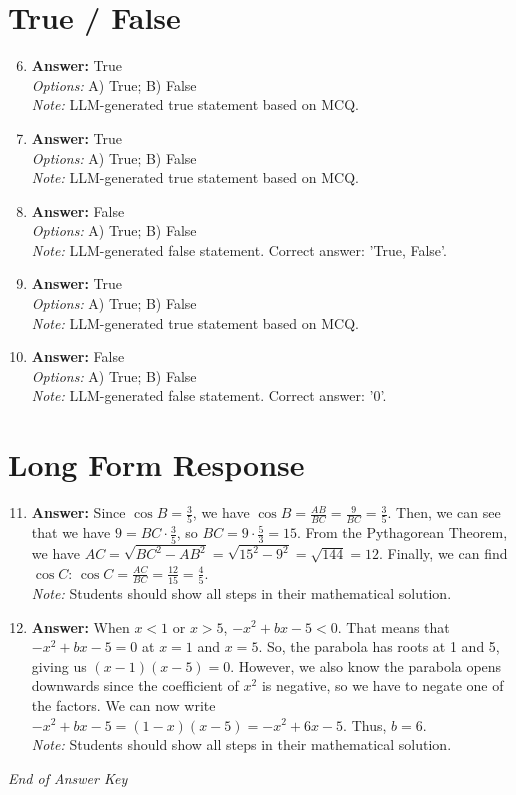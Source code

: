 \documentclass[12pt]{article}
\begin{document}
\section*{True / False}
\begin{enumerate}[label=\arabic*.]
\setcounter{enumi}{5}
\item \textbf{Answer:} True
\\ \textit{Options:} A) True; B) False
\\ \textit{Note:} LLM-generated true statement based on MCQ.
\item \textbf{Answer:} True
\\ \textit{Options:} A) True; B) False
\\ \textit{Note:} LLM-generated true statement based on MCQ.
\item \textbf{Answer:} False
\\ \textit{Options:} A) True; B) False
\\ \textit{Note:} LLM-generated false statement. Correct answer: 'True, False'.
\item \textbf{Answer:} True
\\ \textit{Options:} A) True; B) False
\\ \textit{Note:} LLM-generated true statement based on MCQ.
\item \textbf{Answer:} False
\\ \textit{Options:} A) True; B) False
\\ \textit{Note:} LLM-generated false statement. Correct answer: '0'.
\end{enumerate}

\section*{Long Form Response}
\begin{enumerate}[label=\arabic*.]
\setcounter{enumi}{10}
\item \textbf{Answer:} Since $\cos{B}=\frac{3}{5}$, we have $\cos{B}=\frac{AB}{BC}=\frac{9}{BC}=\frac{3}{5}$. Then, we can see that we have $9=BC\cdot\frac{3}{5}$, so $BC=9\cdot\frac{5}{3}=15$. From the Pythagorean Theorem, we have $AC=\sqrt{BC^2-AB^2}=\sqrt{15^2-9^2}=\sqrt{144}=12$. Finally, we can find $\cos{C}$: $\cos{C}=\frac{AC}{BC}=\frac{12}{15}=\boxed{\frac{4}{5}}$.
\\ \textit{Note:} Students should show all steps in their mathematical solution.
\item \textbf{Answer:} When $x<1$ or $x>5$, $-x^2+bx-5<0$. That means that $-x^2+bx-5=0$ at $x=1$ and $x=5$. So, the parabola has roots at 1 and 5, giving us $(x-1)(x-5)=0$. However, we also know the parabola opens downwards since the coefficient of $x^2$ is negative, so we have to negate one of the factors. We can now write $-x^2+bx-5=(1-x)(x-5)=-x^2+6 x-5$. Thus, $b=\boxed{6}$.
\\ \textit{Note:} Students should show all steps in their mathematical solution.
\end{enumerate}

\vfill
\noindent\textit{End of Answer Key}
\end{document}
